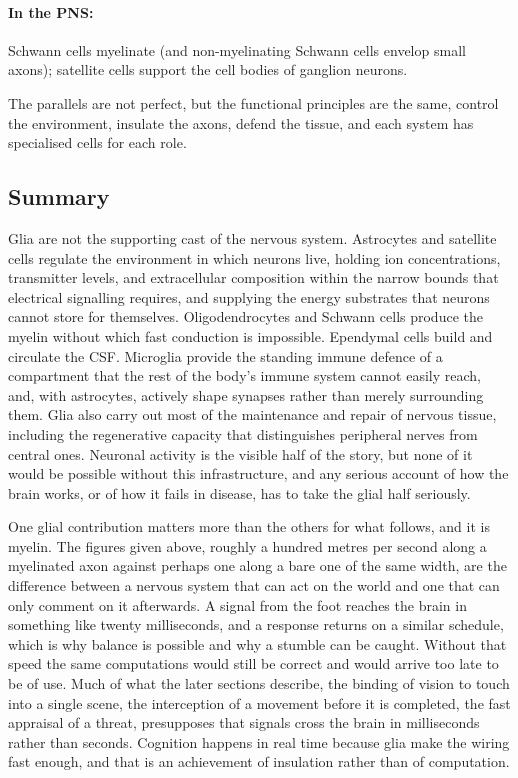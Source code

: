 \documentclass[11pt]{article}
\begin{document}
\paragraph{In the PNS:} Schwann cells myelinate (and non-myelinating Schwann cells envelop small axons); satellite cells support the cell bodies of ganglion neurons.

The parallels are not perfect, but the functional principles are the same, control the environment, insulate the axons, defend the tissue, and each system has specialised cells for each role.

\subsection{Summary}

Glia are not the supporting cast of the nervous system. Astrocytes and satellite cells regulate the environment in which neurons live, holding ion concentrations, transmitter levels, and extracellular composition within the narrow bounds that electrical signalling requires, and supplying the energy substrates that neurons cannot store for themselves. Oligodendrocytes and Schwann cells produce the myelin without which fast conduction is impossible. Ependymal cells build and circulate the CSF. Microglia provide the standing immune defence of a compartment that the rest of the body's immune system cannot easily reach, and, with astrocytes, actively shape synapses rather than merely surrounding them. Glia also carry out most of the maintenance and repair of nervous tissue, including the regenerative capacity that distinguishes peripheral nerves from central ones. Neuronal activity is the visible half of the story, but none of it would be possible without this infrastructure, and any serious account of how the brain works, or of how it fails in disease, has to take the glial half seriously.

One glial contribution matters more than the others for what follows, and it is myelin. The figures given above, roughly a hundred metres per second along a myelinated axon against perhaps one along a bare one of the same width, are the difference between a nervous system that can act on the world and one that can only comment on it afterwards. A signal from the foot reaches the brain in something like twenty milliseconds, and a response returns on a similar schedule, which is why balance is possible and why a stumble can be caught. Without that speed the same computations would still be correct and would arrive too late to be of use. Much of what the later sections describe, the binding of vision to touch into a single scene, the interception of a movement before it is completed, the fast appraisal of a threat, presupposes that signals cross the brain in milliseconds rather than seconds. Cognition happens in real time because glia make the wiring fast enough, and that is an achievement of insulation rather than of computation.
\end{document}
